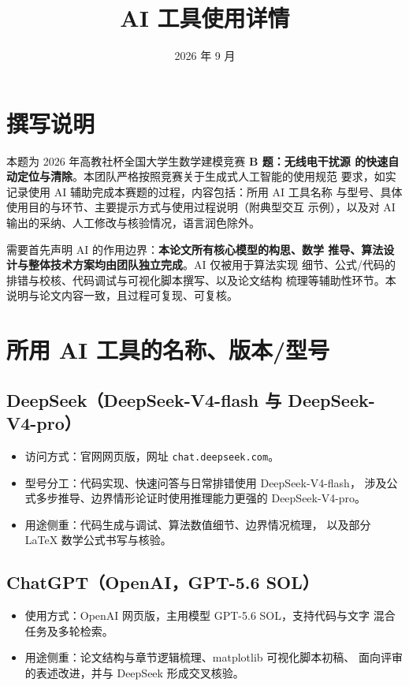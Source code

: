 \documentclass[UTF8,a4paper,12pt]{ctexart}
\title{\textbf{AI 工具使用详情}}
\author{}
\date{2026 年 9 月}
\begin{document}
\maketitle
\vspace{-1em}

\section{撰写说明}

本题为 2026 年高教社杯全国大学生数学建模竞赛 \textbf{B 题：无线电干扰源
的快速自动定位与清除}。本团队严格按照竞赛关于生成式人工智能的使用规范
要求，如实记录使用 AI 辅助完成本赛题的过程，内容包括：所用 AI 工具名称
与型号、具体使用目的与环节、主要提示方式与使用过程说明（附典型交互
示例），以及对 AI 输出的采纳、人工修改与核验情况，语言润色除外。

需要首先声明 AI 的作用边界：\textbf{本论文所有核心模型的构思、数学
推导、算法设计与整体技术方案均由团队独立完成}。AI 仅被用于算法实现
细节、公式/代码的排错与校核、代码调试与可视化脚本撰写、以及论文结构
梳理等辅助性环节。本说明与论文内容一致，且过程可复现、可复核。

\section{所用 AI 工具的名称、版本/型号}

\subsection{DeepSeek（DeepSeek-V4-flash 与 DeepSeek-V4-pro）}
\begin{itemize}
  \item 访问方式：官网网页版，网址 \texttt{chat.deepseek.com}。
  \item 型号分工：代码实现、快速问答与日常排错使用 DeepSeek-V4-flash，
        涉及公式多步推导、边界情形论证时使用推理能力更强的
        DeepSeek-V4-pro。
  \item 用途侧重：代码生成与调试、算法数值细节、边界情况梳理，
        以及部分 LaTeX 数学公式书写与核验。
\end{itemize}

\subsection{ChatGPT（OpenAI，GPT-5.6 SOL）}
\begin{itemize}
  \item 使用方式：OpenAI 网页版，主用模型 GPT-5.6 SOL，支持代码与文字
        混合任务及多轮检索。
  \item 用途侧重：论文结构与章节逻辑梳理、matplotlib 可视化脚本初稿、
        面向评审的表述改进，并与 DeepSeek 形成交叉核验。
\end{itemize}
\end{document}
